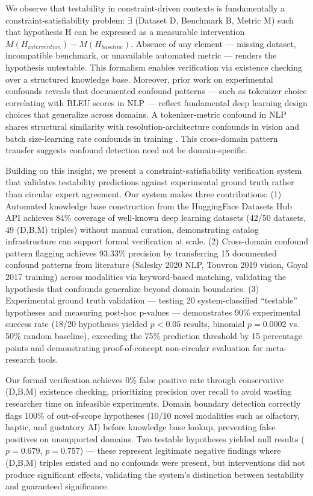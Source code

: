 We observe that testability in constraint-driven contexts is fundamentally a constraint-satisfiability problem: $\exists$ (Dataset D, Benchmark B, Metric M) such that hypothesis H can be expressed as a measurable intervention $M(H_{intervention}) - M(H_{baseline})$. Absence of any element --- missing dataset, incompatible benchmark, or unavailable automated metric --- renders the hypothesis untestable. This formalism enables verification via existence checking over a structured knowledge base. Moreover, prior work on experimental confounds reveals that documented confound patterns --- such as tokenizer choice correlating with BLEU scores in NLP \cite{salesky2020} --- reflect fundamental deep learning design choices that generalize across domains. A tokenizer-metric confound in NLP shares structural similarity with resolution-architecture confounds in vision \cite{touvron2019} and batch size-learning rate confounds in training \cite{goyal2017}. This cross-domain pattern transfer suggests confound detection need not be domain-specific.

Building on this insight, we present a constraint-satisfiability verification system that validates testability predictions against experimental ground truth rather than circular expert agreement. Our system makes three contributions: (1) Automated knowledge base construction from the HuggingFace Datasets Hub API achieves 84\% coverage of well-known deep learning datasets (42/50 datasets, 49 (D,B,M) triples) without manual curation, demonstrating catalog infrastructure can support formal verification at scale. (2) Cross-domain confound pattern flagging achieves 93.33\% precision by transferring 15 documented confound patterns from literature (Salesky 2020 NLP, Touvron 2019 vision, Goyal 2017 training) across modalities via keyword-based matching, validating the hypothesis that confounds generalize beyond domain boundaries. (3) Experimental ground truth validation --- testing 20 system-classified ``testable'' hypotheses and measuring post-hoc p-values --- demonstrates 90\% experimental success rate (18/20 hypotheses yielded $p < 0.05$ results, binomial $p = 0.0002$ vs. 50\% random baseline), exceeding the 75\% prediction threshold by 15 percentage points and demonstrating proof-of-concept non-circular evaluation for meta-research tools.

Our formal verification achieves 0\% false positive rate through conservative (D,B,M) existence checking, prioritizing precision over recall to avoid wasting researcher time on infeasible experiments. Domain boundary detection correctly flags 100\% of out-of-scope hypotheses (10/10 novel modalities such as olfactory, haptic, and gustatory AI) before knowledge base lookup, preventing false positives on unsupported domains. Two testable hypotheses yielded null results ($p = 0.679$, $p = 0.757$) --- these represent legitimate negative findings where (D,B,M) triples existed and no confounds were present, but interventions did not produce significant effects, validating the system's distinction between testability and guaranteed significance.

